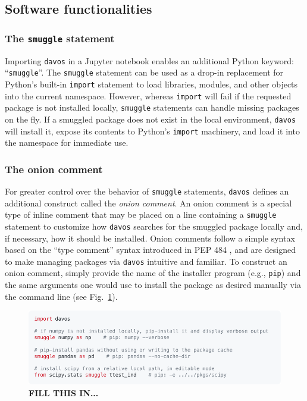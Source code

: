 \documentclass[preprint,12pt, a4paper]{elsarticle}
\begin{document}
\subsection{Software functionalities}%

\subsubsection{The \texttt{smuggle} statement}\label{subsec:smuggle}
Importing \texttt{davos} in a Jupyter notebook enables an additional Python keyword: ``\texttt{smuggle}''.
The \texttt{smuggle} statement can be used as a drop-in replacement for Python's built-in \texttt{import} statement to load libraries, modules, and other objects into the current namespace.
However, whereas \texttt{import} will fail if the requested package is not installed locally, \texttt{smuggle} statements can handle missing packages on the fly.
If a smuggled package does not exist in the local environment, \texttt{davos} will install it, expose its contents to Python's \texttt{import} machinery, and load it into the namespace for immediate use.


\subsubsection{The onion comment}\label{subsec:onion}
For greater control over the behavior of \texttt{smuggle} statements, \texttt{davos} defines an additional construct called the \textit{onion comment}. An onion comment is a special type of inline comment that may be placed on a line containing a \texttt{smuggle} statement to customize how \texttt{davos} searches for the smuggled package locally and, if necessary, how it should be installed. Onion comments follow a simple syntax based on the ``type comment'' syntax introduced in PEP 484 \cite{vanREtal14}, and are designed to make managing packages via \texttt{davos} intuitive and familiar. To construct an onion comment, simply provide the name of the installer program (e.g., \texttt{pip}) and the same arguments one would use to install the package as desired manually via the command line (see Fig.~\ref{fig:snippet1}).

\begin{figure}[h]
\centering
\includegraphics[width=\textwidth]{snippets/snippet1.pdf}
\caption{\small \textbf{FILL THIS IN...}}
\label{fig:snippet1}
\end{figure}
\end{document}
